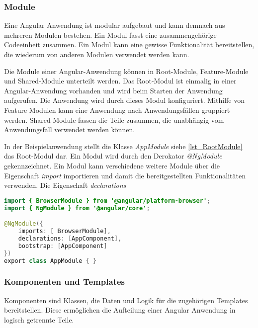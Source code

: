 \subsubsection{Module}


Eine Angular Anwendung ist modular aufgebaut und kann demnach aus mehreren Modulen bestehen. Ein Modul fasst eine zusammengehörige Codeeinheit zusammen. Ein Modul kann eine gewisse Funktionalität bereitstellen, die wiederum von anderen Modulen verwendet werden kann. \autocites[vgl.][103\psqq]{Steyer.2017} 

Die Module einer Angular-Anwendung können in Root-Module, Feature-Module und Shared-Module unterteilt werden. Das Root-Modul ist einmalig in einer Angular-Anwendung vorhanden und wird beim Starten der Anwendung aufgerufen. Die Anwendung wird durch dieses Modul konfiguriert. Mithilfe von Feature Modulen kann eine Anwendung nach Anwendungsfällen gruppiert werden. Shared-Module fassen die Teile zusammen, die unabhängig vom Anwendungsfall verwendet werden können. \autocites[vgl.][528\psqq]{Freeman.2018}[vgl.][]{Google.c}[vgl.][105\psqq]{Steyer.2017}

In der Beispielanwendung stellt die Klasse \textit{AppModule} siehe \autoref{lst_RootModule} das Root-Modul dar. Ein Modul wird durch den Derokator \textit{@NgModule} gekennzeichnet. Ein Modul kann verschiedene weitere Module über die Eigenschaft \textit{import} importieren und damit die bereitgestellten Funktionalitäten verwenden. Die Eigenschaft \textit{declarations} 

\begin{lstlisting}[caption=Das Root-Module in der Datei app.module.ts, label=lst_RootModule, language=Java]
import { BrowserModule } from '@angular/platform-browser';
import { NgModule } from '@angular/core';

@NgModule({
	imports: [ BrowserModule],
	declarations: [AppComponent],
	bootstrap: [AppComponent]
})
export class AppModule { }
\end{lstlisting}




\subsubsection{Komponenten und Templates}


Komponenten sind Klassen, die Daten und Logik für die zugehörigen Templates bereitstellen. Diese ermöglichen die Aufteilung einer Angular Anwendung in logisch getrennte Teile. \autocite[vgl.][401]{Freeman.2018} 

